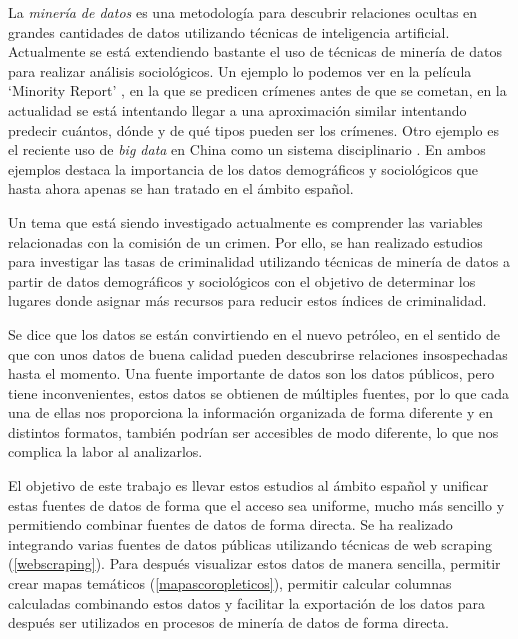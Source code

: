 
La \textit{minería de datos} es una metodología para descubrir relaciones ocultas en grandes cantidades de datos utilizando técnicas de inteligencia artificial. Actualmente se está extendiendo bastante el uso de técnicas de minería de datos para realizar análisis sociológicos. Un ejemplo lo podemos ver en la película `Minority Report' \cite{movie:minorityreport}, en la que se predicen crímenes antes de que se cometan, en la actualidad se está intentando llegar a una aproximación similar intentando predecir cuántos, dónde y de qué tipos pueden ser los crímenes. Otro ejemplo es el reciente uso de \textit{big data} en China como un sistema disciplinario \cite{art:chinabigdata}. En ambos ejemplos destaca la importancia de los datos demográficos y sociológicos que hasta ahora apenas se han tratado en el ámbito español.

Un tema que está siendo investigado actualmente es comprender las variables relacionadas con la comisión de un crimen. Por ello, se han realizado estudios para investigar las tasas de criminalidad utilizando técnicas de minería de datos \cite{art:crimeprediction} \cite{art:crimeprediction2} a partir de datos demográficos y sociológicos con el objetivo de determinar los lugares donde asignar más recursos para reducir estos índices de criminalidad.

Se dice que los datos se están convirtiendo en el nuevo petróleo, en el sentido de que con unos datos de buena calidad pueden descubrirse relaciones insospechadas hasta el momento. Una fuente importante de datos son los datos públicos, pero tiene inconvenientes, estos datos se obtienen de múltiples fuentes, por lo que cada una de ellas nos proporciona la información organizada de forma diferente y en distintos formatos, también podrían ser accesibles de modo diferente, lo que nos complica la labor al analizarlos.

El objetivo de este trabajo es llevar estos estudios al ámbito español y unificar estas fuentes de datos de forma que el acceso sea uniforme, mucho más sencillo y permitiendo combinar fuentes de datos de forma directa. Se ha realizado integrando varias fuentes de datos públicas utilizando técnicas de web scraping (\ref{webscraping}). Para  después visualizar estos datos de manera sencilla, permitir crear mapas temáticos (\ref{mapascoropleticos}), permitir calcular columnas calculadas combinando estos datos y facilitar la exportación de los datos para después ser utilizados en procesos de minería de datos de forma directa.

